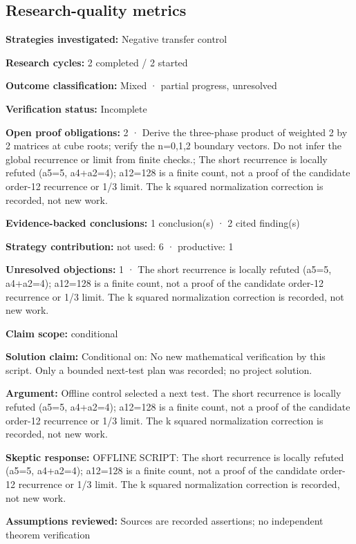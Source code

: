 \documentclass[11pt]{article}
\begin{document}
\subsection{Research-quality metrics}
\textbf{Strategies investigated:} Negative transfer control\par
\textbf{Research cycles:} 2 completed / 2 started\par
\textbf{Outcome classification:} Mixed · partial progress, unresolved\par
\textbf{Verification status:} Incomplete\par
\textbf{Open proof obligations:} 2 · Derive the three-phase product of weighted 2 by 2 matrices at cube roots; verify the n=0,1,2 boundary vectors. Do not infer the global recurrence or limit from finite checks.; The short recurrence is locally refuted (a5=5, a4+a2=4); a12=128 is a finite count, not a proof of the candidate order-12 recurrence or 1/3 limit. The k squared normalization correction is recorded, not new work.\par
\textbf{Evidence-backed conclusions:} 1 conclusion(s) · 2 cited finding(s)\par
\textbf{Strategy contribution:} not used: 6 · productive: 1\par
\textbf{Unresolved objections:} 1 · The short recurrence is locally refuted (a5=5, a4+a2=4); a12=128 is a finite count, not a proof of the candidate order-12 recurrence or 1/3 limit. The k squared normalization correction is recorded, not new work.\par
\textbf{Claim scope:} conditional\par
\textbf{Solution claim:} Conditional on: No new mathematical verification by this script. Only a bounded next-test plan was recorded; no project solution.\par
\textbf{Argument:} Offline control selected a next test. The short recurrence is locally refuted (a5=5, a4+a2=4); a12=128 is a finite count, not a proof of the candidate order-12 recurrence or 1/3 limit. The k squared normalization correction is recorded, not new work.\par
\textbf{Skeptic response:} OFFLINE SCRIPT: The short recurrence is locally refuted (a5=5, a4+a2=4); a12=128 is a finite count, not a proof of the candidate order-12 recurrence or 1/3 limit. The k squared normalization correction is recorded, not new work.\par
\textbf{Assumptions reviewed:} Sources are recorded assertions; no independent theorem verification\par
\end{document}

